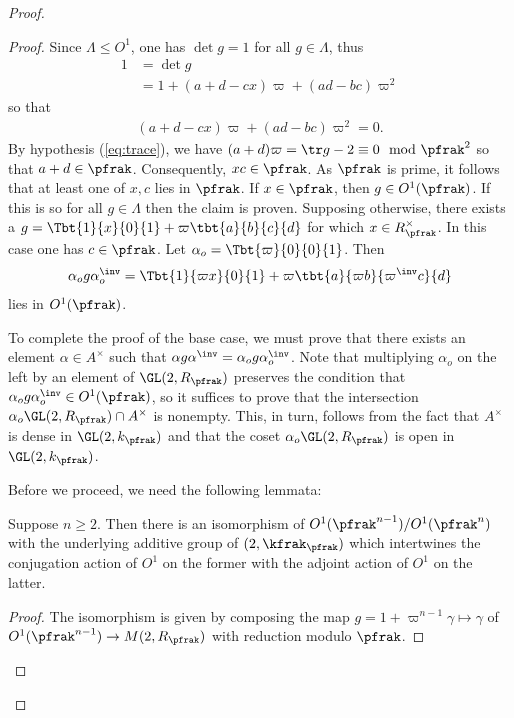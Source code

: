 \begin{proof}
\begin{proof}
  Since $\Lambda \leq O^1$, one has $\det g = 1 $ for all $g\in \Lambda$, thus
  \begin{align*}
    1 & = \det g                                     \\
      & = 1 + (a+d - cx ) \varpi + (ad -bc) \varpi^2
  \end{align*}
  so that
  \begin{align}\label{eq:MandarinLeyden}
    (a+d - cx) \varpi + (ad-bc) \varpi^2 =0.
  \end{align}
  By hypothesis (\ref{eq:trace}), we have $(a+d)\varpi = \tr g -2 \equiv 0 \mod \pfrak^2$ so that $a+d \in \pfrak$. Consequently, $xc \in \pfrak$. As $\pfrak$ is prime, it follows that at least one of $x,c$ lies in $\pfrak$. If $x \in \pfrak$, then $g \in O^1(\pfrak)$. If this is so for all $g \in \Lambda$ then the claim is proven. Supposing otherwise, there exists a $ g = \Tbt{1}{x}{0}{1} + \varpi \tbt{a}{b}{c}{d}$ for which $x \in R_\pfrak^\times$. In this case one has $c \in \pfrak$. Let $\alpha_o = \Tbt{\varpi}{0}{0}{1}$. Then
  \begin{align*}
    \alpha_o g\alpha_o^\inv  = \Tbt{1}{\varpi x}{0}{1} + \varpi \tbt{a}{\varpi b}{\varpi^\inv c}{d}
  \end{align*}
  lies in $O^1(\pfrak)$.

  To complete the proof of the base case, we must prove that there exists an element $\alpha \in A^\times $ such that $\alpha g \alpha^\inv =  \alpha_o g \alpha_o^\inv$. Note that multiplying $\alpha_o$ on the left by an element of $\GL(2,R_\pfrak)$ preserves the condition that $\alpha_o g \alpha_o^\inv \in O^1(\pfrak)$, so it suffices to prove that the intersection $\alpha_o \GL(2,R_\pfrak) \cap A^\times $ is nonempty. This, in turn, follows from the fact that $A^\times$ is dense in $\GL(2,k_\pfrak)$ and that the coset  $\alpha_o \GL(2,R_\pfrak)$ is open in $\GL(2,k_\pfrak)$.

  Before we proceed, we need the following lemmata:
  \begin{lemma}\label{lemma:iso}
    Suppose $n\geq 2$. Then there is an isomorphism of $O^1(\pfrak^{n-1}) / O^1(\pfrak^{n})$ with the underlying additive group of $\sl(2,\kfrak_\pfrak)$ which intertwines the conjugation action of $O^1$ on the former with the adjoint action of $O^1$ on the latter.
  \end{lemma}
  \begin{proof}
    The isomorphism is given by composing the map $g = 1 + \varpi^{n-1}\gamma \mapsto \gamma$  of $O^1(\pfrak^{n-1}) \to M(2,R_\pfrak)$ with reduction modulo $\pfrak$.
  \end{proof}


\end{proof}
\end{proof}
